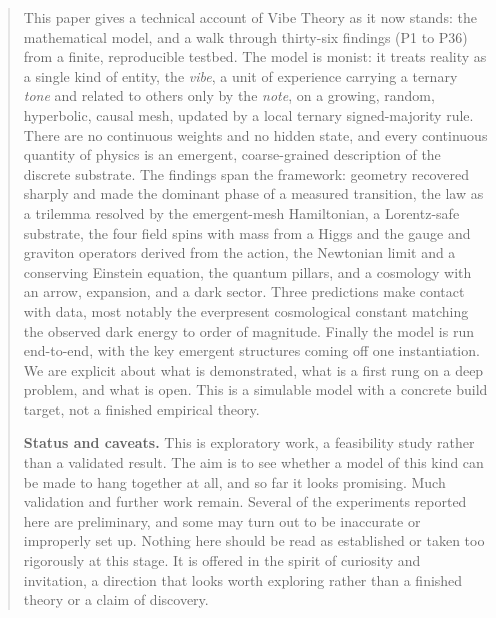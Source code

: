 \begin{abstract}
This paper gives a technical account of Vibe Theory as it now stands: the mathematical
model, and a walk through thirty-six findings (P1 to P36) from a finite, reproducible
testbed. The model is monist: it treats reality as a single kind of entity, the
\emph{vibe}, a unit of experience carrying a ternary \emph{tone} and related to others
only by the \emph{note}, on a growing, random, hyperbolic, causal mesh, updated by a
local ternary signed-majority rule. There are no continuous weights and no hidden state,
and every continuous quantity of physics is an emergent, coarse-grained description of
the discrete substrate. The findings span the framework: geometry recovered sharply and
made the dominant phase of a measured transition, the law as a trilemma resolved by the
emergent-mesh Hamiltonian, a Lorentz-safe substrate, the four field spins with mass from
a Higgs and the gauge and graviton operators derived from the action, the Newtonian
limit and a conserving Einstein equation, the quantum pillars, and a cosmology with an
arrow, expansion, and a dark sector. Three predictions make contact with data, most
notably the everpresent cosmological constant matching the observed dark energy to order
of magnitude. Finally the model is run end-to-end, with the key emergent structures
coming off one instantiation. We are explicit about what is demonstrated, what is a first
rung on a deep problem, and what is open. This is a simulable model with a concrete build
target, not a finished empirical theory.
\medskip

\noindent\textbf{Status and caveats.} This is exploratory work, a feasibility study rather than a validated result. The aim is to see whether a model of this kind can be made to hang together at all, and so far it looks promising. Much validation and further work remain. Several of the experiments reported here are preliminary, and some may turn out to be inaccurate or improperly set up. Nothing here should be read as established or taken too rigorously at this stage. It is offered in the spirit of curiosity and invitation, a direction that looks worth exploring rather than a finished theory or a claim of discovery.
\end{abstract}
